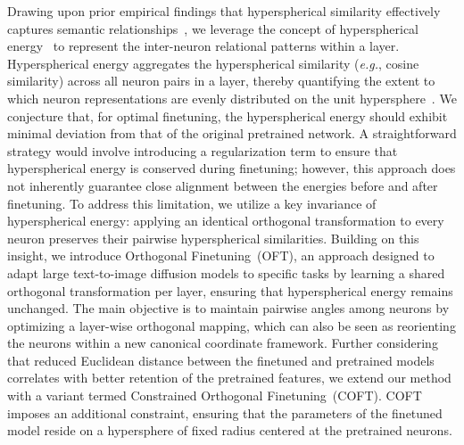 Drawing upon prior empirical findings that hyperspherical similarity effectively captures semantic relationships~\cite{liu2017deep,liu2018decoupled,chen2020angular}, we leverage the concept of hyperspherical energy~\cite{liu2018learning} to represent the inter-neuron relational patterns within a layer. Hyperspherical energy aggregates the hyperspherical similarity (\emph{e.g.}, cosine similarity) across all neuron pairs in a layer, thereby quantifying the extent to which neuron representations are evenly distributed on the unit hypersphere~\cite{liu2021learning}. We conjecture that, for optimal finetuning, the hyperspherical energy should exhibit minimal deviation from that of the original pretrained network. A straightforward strategy would involve introducing a regularization term to ensure that hyperspherical energy is conserved during finetuning; however, this approach does not inherently guarantee close alignment between the energies before and after finetuning. To address this limitation, we utilize a key invariance of hyperspherical energy: applying an identical orthogonal transformation to every neuron preserves their pairwise hyperspherical similarities. Building on this insight, we introduce Orthogonal Finetuning~(OFT), an approach designed to adapt large text-to-image diffusion models to specific tasks by learning a shared orthogonal transformation per layer, ensuring that hyperspherical energy remains unchanged. The main objective is to maintain pairwise angles among neurons by optimizing a layer-wise orthogonal mapping, which can also be seen as reorienting the neurons within a new canonical coordinate framework. Further considering that reduced Euclidean distance between the finetuned and pretrained models correlates with better retention of the pretrained features, we extend our method with a variant termed Constrained Orthogonal Finetuning~(COFT). COFT imposes an additional constraint, ensuring that the parameters of the finetuned model reside on a hypersphere of fixed radius centered at the pretrained neurons.

